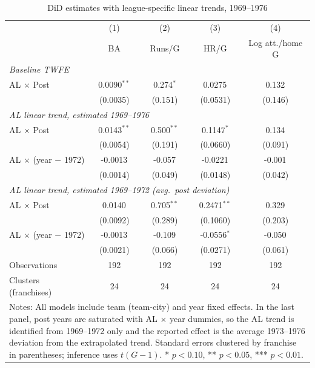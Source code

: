 \begin{table}[htbp]\centering
\caption{DiD estimates with league-specific linear trends, 1969--1976}
\label{tab:league_trends}
\begin{tabular}{lcccc}
\hline\hline
 & (1) & (2) & (3) & (4) \\
 & BA & Runs/G & HR/G & Log att./home G \\
\hline
\multicolumn{5}{l}{\textit{Baseline TWFE}} \\
AL $\times$ Post & 0.0090$^{**}$ & 0.274$^{*}$ & 0.0275$^{}$ & 0.132$^{}$ \\
 & (0.0035) & (0.151) & (0.0531) & (0.146) \\
[0.5ex]
\multicolumn{5}{l}{\textit{AL linear trend, estimated 1969--1976}} \\
AL $\times$ Post & 0.0143$^{**}$ & 0.500$^{**}$ & 0.1147$^{*}$ & 0.134$^{}$ \\
 & (0.0054) & (0.191) & (0.0660) & (0.091) \\
AL $\times$ (year $-$ 1972) & -0.0013$^{}$ & -0.057$^{}$ & -0.0221$^{}$ & -0.001$^{}$ \\
 & (0.0014) & (0.049) & (0.0148) & (0.042) \\
[0.5ex]
\multicolumn{5}{l}{\textit{AL linear trend, estimated 1969--1972 (avg.\ post deviation)}} \\
AL $\times$ Post & 0.0140$^{}$ & 0.705$^{**}$ & 0.2471$^{**}$ & 0.329$^{}$ \\
 & (0.0092) & (0.289) & (0.1060) & (0.203) \\
AL $\times$ (year $-$ 1972) & -0.0013$^{}$ & -0.109$^{}$ & -0.0556$^{*}$ & -0.050$^{}$ \\
 & (0.0021) & (0.066) & (0.0271) & (0.061) \\
[0.5ex]
\hline
Observations & 192 & 192 & 192 & 192 \\
Clusters (franchises) & 24 & 24 & 24 & 24 \\
\hline\hline
\multicolumn{5}{p{0.9\linewidth}}{\footnotesize Notes: All models include team (team-city) and year fixed effects. In the last panel, post years are saturated with AL $\times$ year dummies, so the AL trend is identified from 1969--1972 only and the reported effect is the average 1973--1976 deviation from the extrapolated trend. Standard errors clustered by franchise in parentheses; inference uses $t(G-1)$. * $p<0.10$, ** $p<0.05$, *** $p<0.01$.} \\
\end{tabular}
\end{table}
